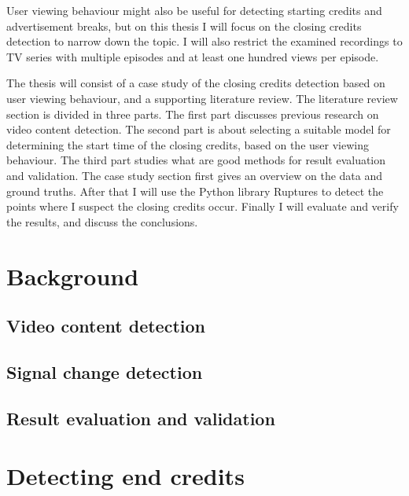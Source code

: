 User viewing behaviour might also be useful for detecting starting credits and advertisement breaks, but on this thesis I will focus on the closing credits detection to narrow down the topic. I will also restrict the examined recordings to TV series with multiple episodes and at least one hundred views per episode.

The thesis will consist of a case study of the closing credits detection based on user viewing behaviour, and a supporting literature review. The literature review section is divided in three parts. The first part discusses previous research on video content detection. The second part is about selecting a suitable model for determining the start time of the closing credits, based on the user viewing behaviour. The third part studies what are good methods for result evaluation and validation. The case study section first gives an overview on the data and ground truths. After that I will use the Python library Ruptures to detect the points where I suspect the closing credits occur. Finally I will evaluate and verify the results, and discuss the conclusions.

\section{Background} \label{sec:background}

\subsection{Video content detection} \label{subsec:detection}

\subsection{Signal change detection} \label{subsec:methods}

\subsection{Result evaluation and validation} \label{subsec:validation}

\section{Detecting end credits} \label{sec:casestudy}

